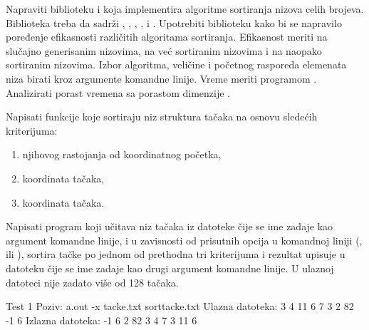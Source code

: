 \begin{Exercise}[label=507]
  Napraviti biblioteku  i  koja
  implementira algoritme sortiranja nizova celih brojeva. Biblioteka
  treba da sadrži , , , , 
   i . Upotrebiti biblioteku kako 
  bi se napravilo poređenje
  efikasnosti različitih algoritama sortiranja. Efikasnost meriti na
  slučajno generisanim nizovima, na već sortiranim nizovima i na
  naopako sortiranim nizovima. Izbor algoritma, veličine i početnog
  rasporeda elemenata niza birati kroz argumente komandne linije.
  Vreme meriti programom . Analizirati porast vremena sa
  porastom dimenzije .
  
\end{Exercise}

\begin{Exercise}[label=508]
  Napisati funkcije koje sortiraju niz struktura tačaka na
  osnovu sledećih kriterijuma:
  \begin{enumerate}
  \item njihovog rastojanja od koordinatnog početka,
  \item {} koordinata tačaka,
  \item {}koordinata tačaka.
  \end{enumerate}
  Napisati program koji učitava niz tačaka iz datoteke čije se ime
  zadaje kao argument komandne linije, i u zavisnosti od prisutnih
  opcija u komandnoj liniji (,  ili ),
  sortira tačke po jednom od prethodna tri kriterijuma i rezultat
  upisuje u datoteku čije se ime zadaje kao drugi argument komandne
  linije. U ulaznoj datoteci nije zadato više od 128 tačaka.
  
\begin{miditest}
\begin{test}{Test 1}
Poziv:  a.out -x tacke.txt sorttacke.txt
Ulazna datoteka:
3 4
11 6
7 3
2 82
-1 6
Izlazna datoteka:
-1 6
2 82
3 4
7 3
11 6
\end{test}
\end{miditest}
  
\end{Exercise}

